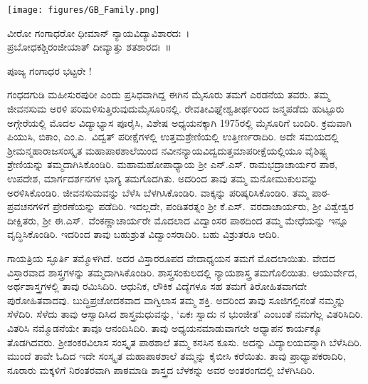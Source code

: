 {\fontsize{14}{16}\selectfont
\thispagestyle{plain}
\centerline{\texttt{[image: figures/GB\_Family.png]}}

\begin{center}
ವೀರೋ ಗಂಗಾಧರೋ ಧೀಮಾನ್ ನ್ಯಾಯವಿದ್ಯಾವಿಶಾರದಃ~।\\
ಪ್ರಬೋಧಕಶ್ಚಿರಂಜೀಯಾತ್ ದೀವ್ಯಾತ್ತು ಶತಶಾರದಃ~॥
\end{center}

ಪೂಜ್ಯ ಗಂಗಾಧರ ಭಟ್ಟರೇ !

ಗಂಧದಗುಡಿ ಮಹೀಸುರಪುರೀ ಎಂದು ಪ್ರಸಿಧವಾಗಿದ್ದ ಈಗಿನ ಮೈಸೂರು ತಮಗೆ ಎರಡನೆಯ ತವರು. ತಮ್ಮ ಜೀವನಸುಮ ಅರಳಿ ಪರಿಮಳಿಸುತ್ತಿರುವುದು\break ಮೈಸೂರಿ\-ನಲ್ಲಿ. ರೇವತೀವಿಘ್ನೇಶ್ವತೀರ್ಥರಿಂದ ಜನ್ಮಪಡೆದು ಹುಟ್ಟೂರು ಅಗ್ಗೇರೆಯಲ್ಲಿ ಮೊದಲ ವಿದ್ಯಾಭ್ಯಾಸ ಪೂರೈಸಿ, ವಿಶೇಷ ಅಧ್ಯಯನಕ್ಕಾಗಿ 1975ರಲ್ಲಿ ಮೈಸೂರಿಗೆ ಬಂದಿರಿ. ಕ್ರಮವಾಗಿ ಪಿಯುಸಿ, ಬಿಕಾಂ, ಎಂ.ಎ.\ ವಿದ್ವತ್ ಪರೀಕ್ಷೆಗಳಲ್ಲಿ ಉತ್ತಮಶ್ರೇಣಿ\-ಯಲ್ಲಿ ಉತ್ತೀರ್ಣರಾದಿರಿ. ಅದೇ ಸಮಯದಲ್ಲಿ ಶ್ರೀಮನ್ಮಹಾರಾಜಸಂಸ್ಕೃತ ಮಹಾ\-ಪಾಠಶಾಲೆಯಿಂದ ನವೀನನ್ಯಾಯವಿದ್ವದುತ್ತಮಾಪರೀಕ್ಷೆಯಲ್ಲಿಯೂ ವೈಶಿಷ್ಟ್ಯ ಶ್ರೇಣಿ\-ಯನ್ನು ತಮ್ಮದಾಗಿಸಿಕೊಂಡಿರಿ. ಮಹಾಮಹೋಪಾಧ್ಯಾಯ ಶ್ರೀ ಎನ್.ಎಸ್. ರಾಮ\-ಭದ್ರಾಚಾರ್ಯರ ಪಾಠ, ಉಪದೇಶ, ಮಾರ್ಗದರ್ಶನಗಳ ಭಾಗ್ಯ ತಮಗೊದಗಿತು. ಅದರಿಂದ ತಾವು ತಮ್ಮ ಮನೋಮುಕುಲವನ್ನು ಅರಳಿಸಿಕೊಂಡಿರಿ. ಜೀವನಸುಮವನ್ನು ಬೆಳೆಸಿ ಬೆಳಗಿಸಿಕೊಂಡಿರಿ. ವಾಕ್ಕನ್ನು ಪರಿಷ್ಕರಿಸಿಕೊಂಡಿರಿ. ತಮ್ಮ ಪಾಠ-ಪ್ರವಚನಗಳಿಗೆ ಪ್ರೇರಣೆಯನ್ನು ಪಡೆದಿರಿ. ಇದಲ್ಲದೇ, ಪಂಡಿತರತ್ನಂ ಶ್ರೀ ಕೆ.ಎಸ್.\ \hbox{ವರದಾಚಾರ್ಯರು}, ಶ್ರೀ ವಿಶ್ವೇಶ್ವರ ದೀಕ್ಷಿತರು, ಶ್ರೀ ಈ.ಎಸ್.\ ವೆಂಕಣ್ಣಾಚಾರ್ಯರೇ ಮೊದಲಾದ ವಿದ್ವಾಂಸರ ಪಾಠದಿಂದ ತಮ್ಮ ಮೇಧೆಯನ್ನು ಇನ್ನೂ ವೃದ್ಧಿಸಿಕೊಂಡಿರಿ. ಇದರಿಂದ ತಾವು ಬಹುಶ್ರುತ ವಿದ್ವಾಂಸರಾದಿರಿ. ಬಹು ವಿಶ್ರುತರೂ ಆದಿರಿ.

ಗಾಯತ್ರಿಯ ಸ್ಫೂರ್ತಿ ತಮ್ಮೊಳಗಿದೆ. ಅದರ ವಿಸ್ತಾರರೂಪದ ವೇದಾಧ್ಯಯನ ತಮಗೆ ಮೊದಲಾಯಿತು. ವೇದದ ವಿಸ್ತಾರವಾದ ಶಾಸ್ತ್ರಗಳನ್ನು ತಮ್ಮದಾಗಿಸಿಕೊಂಡಿರಿ. ಶಾಸ್ತ್ರಸಂಕುಲದಲ್ಲಿ ನ್ಯಾಯಶಾಸ್ತ್ರ ತಮಗೊಲಿಯಿತು. ಆಯುರ್ವೇದ, ಅರ್ಥಶಾಸ್ತ್ರ\-ಗಳಲ್ಲಿ ತಾವು ರಮಿಸಿದಿರಿ. ಆಧುನಿಕ, ಲೌಕಿಕ ವಿದ್ಯೆ\-ಗಳೂ ಸಹ ತಮಗೆ ತಿರೋಹಿತವಾಗದೇ ಪುರೋಹಿತವಾದವು. ಬುದ್ಧಿಪ್ರಚೋದಕವಾದ ವಾಗ್ವಿಲಾಸ ತಮ್ಮ ಶಕ್ತಿ. ಅದರಿಂದ ತಾವು ಸೂಜಿಗಲ್ಲಿನಂತೆ ನಮ್ಮನ್ನು ಸೆಳೆದಿರಿ. ಸೆಳೆದು ತಾವು ಆಸ್ವಾದಿಸಿದ ಶಾಸ್ತ್ರಮಧುವನ್ನು,  ‘ಏಕಃ ಸ್ವಾದು ನ ಭುಂಜೀತ’ ಎಂಬಂತೆ ನಮಗೆಲ್ಲ ವಿತರಿಸಿದಿರಿ. ವಿತರಿಸಿ ನಮ್ಮೊಡನೆಯೇ ತಾವೂ ಆನಂದಿಸಿದಿರಿ. ತಾವು ಅಧ್ಯಯನಮಾಡುವಾಗಲೇ ಅಧ್ಯಾಪನ ಕಾರ್ಯಕ್ಕೂ ತೊಡಗಿದವರು. ಶ್ರೀಶಂಕರವಿಲಾಸ ಸಂಸ್ಕೃತ ಪಾಠಶಾಲೆ ತಮ್ಮ ಕನಸಿನ ಕೂಸು. ಅದನ್ನು ವಿದ್ಯಾಲಯ\-ವನ್ನಾಗಿ ಬೆಳೆಸಿದಿರಿ. ಮುಂದೆ ತಾವೇ ಓದಿದ ಇದೇ ಸಂಸ್ಕೃತ ಮಹಾಪಾಠಶಾಲೆ ತಮ್ಮನ್ನು ಕೈಬೀಸಿ ಕರೆಯಿತು. ತಾವು ಪ್ರಾಧ್ಯಾಪಕರಾದಿರಿ, ನೂರಾರು ಮಕ್ಕಳಿಗೆ ನಿರಂತರವಾಗಿ ಪಾಠಮಾಡಿ ಶಾಸ್ತ್ರದ ಬೆಳಕನ್ನು ಅವರ ಅಂತರಂಗದಲ್ಲಿ ಬೆಳಗಿಸಿದಿರಿ. 

}
